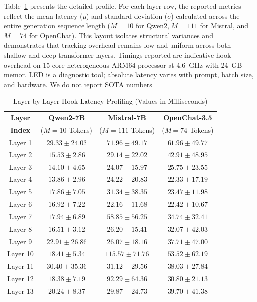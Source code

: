 \documentclass[10pt,conference]{IEEEtran}
\begin{document}
Table~\ref{tab:layer_latencies_detailed} presents the detailed profile. For each layer row, the reported metrics reflect the mean latency ($\mu$) and standard deviation ($\sigma$) calculated across the entire generation sequence length ($M = 10$ for Qwen2, $M = 111$ for Mistral, and $M = 74$ for OpenChat). This layout isolates structural variances and demonstrates that tracking overhead remains low and uniform across both shallow and deep transformer layers.
Timings reported are indicative hook overhead on 15-core heterogeneous ARM64 processor at 4.6~GHz with 24~GB memor. LED is a diagnostic tool; absolute latency varies with prompt, batch size, and hardware. We do not report SOTA numbers
\begin{table}[htbp]
\centering
\caption{Layer-by-Layer Hook Latency Profiling (Values in Milliseconds)\protect\footnotemark}
\label{tab:layer_latencies_detailed}
\begin{tabular}{cccc}
\toprule
\textbf{Layer} & \textbf{Qwen2-7B} & \textbf{Mistral-7B} & \textbf{OpenChat-3.5} \\
\textbf{Index} & ($M=10$ Tokens) & ($M=111$ Tokens) & ($M=74$ Tokens) \\
\midrule
Layer 1  & $29.33 \pm 24.03$ & $71.96 \pm 49.17$ & $61.96 \pm 49.77$ \\
Layer 2  & $15.53 \pm 2.86$ & $29.14 \pm 22.02$ & $42.91 \pm 48.95$ \\
Layer 3  & $14.10 \pm 4.65$ & $24.07 \pm 15.97$ & $25.75 \pm 23.55$ \\
Layer 4  & $13.86 \pm 2.96$ & $24.22 \pm 20.83$ & $22.33 \pm 17.19$ \\
Layer 5  & $17.86 \pm 7.05$ & $31.34 \pm 38.35$ & $23.47 \pm 11.98$ \\
Layer 6  & $16.92 \pm 7.22$ & $22.16 \pm 11.68$ & $22.42 \pm 10.67$ \\
Layer 7  & $17.94 \pm 6.89$ & $58.85 \pm 56.25$ & $34.74 \pm 32.41$ \\
Layer 8  & $16.51 \pm 3.12$ & $26.20 \pm 15.41$ & $32.07 \pm 42.03$ \\
Layer 9  & $22.91 \pm 26.86$ & $26.07 \pm 18.16$ & $37.71 \pm 47.00$ \\
Layer 10 & $18.41 \pm 5.34$ & $115.57 \pm 71.76$ & $53.52 \pm 62.19$ \\
Layer 11 & $30.40 \pm 35.36$ & $31.12 \pm 29.56$ & $38.03 \pm 27.84$ \\
Layer 12 & $18.38 \pm 7.19$ & $92.29 \pm 64.36$ & $30.80 \pm 21.13$ \\
Layer 13 & $20.24 \pm 8.37$ & $29.87 \pm 24.73$ & $39.70 \pm 41.38$ \\

\end{tabular}
\end{table}
\end{document}
